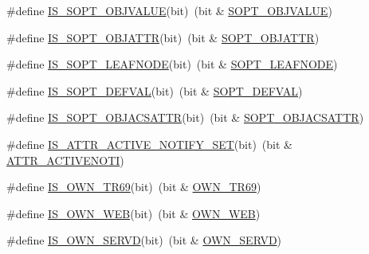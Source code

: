 \begin{DoxyCompactItemize}
\item 
\#define \hyperlink{group__LIBHELP_ga5132c687406cf7f84b7219781c9b4cfc}{I\-S\-\_\-\-S\-O\-P\-T\-\_\-\-O\-B\-J\-V\-A\-L\-U\-E}(bit)~(bit \& \hyperlink{group__LIBHELP_gga26a2d765c9669d7cf62818f31a306f76a509d34676cdc189cd6db36c8f31df9c0}{S\-O\-P\-T\-\_\-\-O\-B\-J\-V\-A\-L\-U\-E})
\item 
\#define \hyperlink{group__LIBHELP_ga11f6b708dad9417466bd2bfab197af82}{I\-S\-\_\-\-S\-O\-P\-T\-\_\-\-O\-B\-J\-A\-T\-T\-R}(bit)~(bit \& \hyperlink{group__LIBHELP_gga26a2d765c9669d7cf62818f31a306f76a08d5b1a74d6081b7c8fcf583dab97752}{S\-O\-P\-T\-\_\-\-O\-B\-J\-A\-T\-T\-R})
\item 
\#define \hyperlink{group__LIBHELP_ga5e45de634eacadfc2cc46c8422330c13}{I\-S\-\_\-\-S\-O\-P\-T\-\_\-\-L\-E\-A\-F\-N\-O\-D\-E}(bit)~(bit \& \hyperlink{group__LIBHELP_gga26a2d765c9669d7cf62818f31a306f76a34f27eaeec6a02cf39bc5f9ccd625e84}{S\-O\-P\-T\-\_\-\-L\-E\-A\-F\-N\-O\-D\-E})
\item 
\#define \hyperlink{group__LIBHELP_gac7ace9f231770f115c71ae45278b6896}{I\-S\-\_\-\-S\-O\-P\-T\-\_\-\-D\-E\-F\-V\-A\-L}(bit)~(bit \& \hyperlink{group__LIBHELP_gga26a2d765c9669d7cf62818f31a306f76a43d345af96a636bddcae661c50020347}{S\-O\-P\-T\-\_\-\-D\-E\-F\-V\-A\-L})
\item 
\#define \hyperlink{group__LIBHELP_gaac90c97c5208e7ecfdb6609aa47c4f1a}{I\-S\-\_\-\-S\-O\-P\-T\-\_\-\-O\-B\-J\-A\-C\-S\-A\-T\-T\-R}(bit)~(bit \& \hyperlink{group__LIBHELP_gga26a2d765c9669d7cf62818f31a306f76a9830de59cb01d6e64813002b2dffe92c}{S\-O\-P\-T\-\_\-\-O\-B\-J\-A\-C\-S\-A\-T\-T\-R})
\item 
\#define \hyperlink{group__LIBHELP_gaea736e9adc5faa41adc84af9793776fa}{I\-S\-\_\-\-A\-T\-T\-R\-\_\-\-A\-C\-T\-I\-V\-E\-\_\-\-N\-O\-T\-I\-F\-Y\-\_\-\-S\-E\-T}(bit)~(bit \& \hyperlink{group__LIBHELP_gga394c61369f4e995f18b58c77d1a3cccba660b640063fbc5ee2d289a3fa58d0d93}{A\-T\-T\-R\-\_\-\-A\-C\-T\-I\-V\-E\-N\-O\-T\-I})
\item 
\#define \hyperlink{group__LIBHELP_ga15e8b7e7c3992695f60e90ec7f5cb0da}{I\-S\-\_\-\-O\-W\-N\-\_\-\-T\-R69}(bit)~(bit \& \hyperlink{group__LIBHELP_gga3b5e9e55eb7b08d5702a101e529e5507afd4ab478568086323ad31db39ff42c55}{O\-W\-N\-\_\-\-T\-R69})
\item 
\#define \hyperlink{group__LIBHELP_ga1fc700d6ed6c0212ca1f376c31d52e7b}{I\-S\-\_\-\-O\-W\-N\-\_\-\-W\-E\-B}(bit)~(bit \& \hyperlink{group__LIBHELP_gga3b5e9e55eb7b08d5702a101e529e5507a6d24bd2ee1e2fe7ec7b1453c835221f6}{O\-W\-N\-\_\-\-W\-E\-B})
\item 
\#define \hyperlink{group__LIBHELP_ga7e5fcef52a724ff4bd291a4d0d42910e}{I\-S\-\_\-\-O\-W\-N\-\_\-\-S\-E\-R\-V\-D}(bit)~(bit \& \hyperlink{group__LIBHELP_gga3b5e9e55eb7b08d5702a101e529e5507aa456b29529a8625118c2e5002ddde02a}{O\-W\-N\-\_\-\-S\-E\-R\-V\-D})

\end{DoxyCompactItemize}
